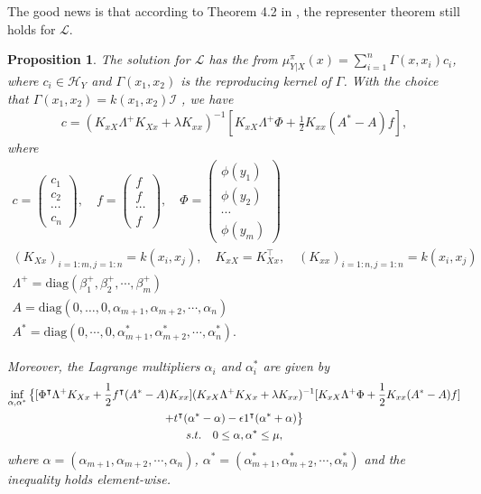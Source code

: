 \documentclass[a4paper]{article}
\newcommand{\up}{\mathrm}
\renewcommand{\cal}{\mathcal}
\newcommand{\T}{\intercal}
\newtheorem{proposition}{Proposition}
\begin{document}
The good news is that according to Theorem 4.2 in \cite{micchelli2005learning}, the representer theorem still holds for $\cal{L}$. 
\begin{proposition}\label{prop:c}
The solution for $\cal{L}$ has the from $\mu_{Y|X}^\pi(x) = \sum_{i=1}^{n} \Gamma(x,x_i)c_i$, where $c_i \in \cal{H}_Y$ and $\Gamma(x_1,x_2)$ is the reproducing kernel of $\Gamma$. With the choice that $\Gamma(x_1,x_2) = k(x_1,x_2)\cal{I}$ , we have
\begin{align}
c = (K_{xX}\Lambda^+K_{Xx}+\lambda K_{xx})^{-1}\left[K_{xX}\Lambda^+ \Phi + \frac{1}{2}K_{xx}(A^*-A)f\right],\label{eqn:cKinv}
\end{align}
where
\begin{gather}
c = \begin{pmatrix}
c_1\\
c_2\\
\cdots\\
c_{n}
\end{pmatrix},\quad 
f = \begin{pmatrix}
f\\
f\\
\cdots\\
f
\end{pmatrix},\quad
\Phi=\begin{pmatrix}
\phi(y_1)\\
\phi(y_2)\\
\cdots\\
\phi(y_{m})
\end{pmatrix}\\
(K_{Xx})_{i=1:m,j=1:n} = k(x_i,x_j),\quad K_{xX} = K_{Xx}^\T,\quad (K_{xx})_{i=1:n,j=1:n} = k(x_i,x_j)\\
\Lambda^+ = \up{diag}(\beta_1^+,\beta_2^+,\cdots,\beta_m^+)\\
A = \up{diag}(0,\dots,0,\alpha_{m+1},\alpha_{m+2},\cdots,\alpha_{n})\\
A^* = \up{diag}(0,\cdots,0,\alpha_{m+1}^*,\alpha_{m+2}^*,\cdots,\alpha_{n}^*).
\end{gather}

Moreover, the Lagrange multipliers $\alpha_i$ and $\alpha_i^*$ are given by
\begin{gather}
\inf_{\alpha,\alpha^*} \big\{ [\Phi^\T \Lambda^+ K_{Xx} + \frac{1}{2} f^\T (A^* - A)K_{xx}](K_{xX}\Lambda^+ K_{Xx} +\lambda K_{xx})^{-1}[K_{xX}\Lambda^+\Phi + \frac{1}{2} K_{xx} (A^* - A)f]\notag\\+ t^\T (\alpha^* - \alpha) - \epsilon 1^\T (\alpha^* + \alpha)\big\}\label{eqn:lagmulti}\\
 s.t.\quad 0 \leq \alpha,\alpha^* \leq \mu,\notag
\end{gather}
where $\alpha = (\alpha_{m+1},\alpha_{m+2},\cdots,\alpha_{n})$, $\alpha^* = (\alpha_{m+1}^*,\alpha_{m+2}^*,\cdots,\alpha_{n}^*)$ and the inequality holds element-wise.
\end{proposition}
\end{document}

